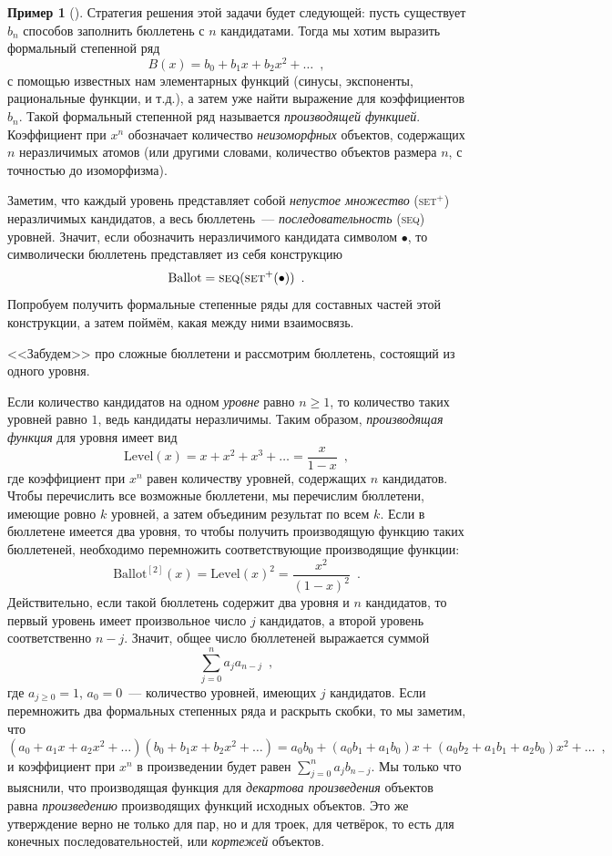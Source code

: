 \documentclass{article}
\theoremstyle{definition}
\newtheorem{example}{Пример}
\begin{document}
\begin{example}[{\cite[Example 10, p.36]{species}}]
Стратегия решения этой задачи будет следующей: пусть существует \( b_n \) 
способов заполнить бюллетень с \( n \) кандидатами. Тогда мы хотим выразить 
формальный степенной ряд
\[
	B(x) = b_0 + b_1 x + b_2 x^2 + \ldots \enspace ,
\]
с помощью известных нам элементарных функций (синусы, экспоненты, рациональные 
функции, и т.д.), а затем уже найти выражение для коэффициентов \( b_n \). 
Такой формальный степенной ряд называется \textit{производящей функцией}. 
Коэффициент при \( x^n \) обозначает количество \textit{неизоморфных} объектов, 
содержащих \( n \) неразличимых
атомов (или другими словами, количество объектов размера \( n \), с точностью 
до изоморфизма).

Заметим, что каждый уровень представляет собой \textit{непустое множество} 
(\textsc{set}\( ^{+} \)) неразличимых кандидатов, а весь бюллетень~--- 
\textit{последовательность} (\textsc{seq}) уровней. Значит, если обозначить 
неразличимого кандидата символом \( \bullet \), то символически бюллетень 
представляет из себя конструкцию
\[
	\mathrm{Ballot} = \text{\textsc{seq}(\textsc{set$^{+}$}($\bullet$))}
	\enspace .
\]
Попробуем получить формальные степенные ряды для составных частей этой 
конструкции, а затем поймём, какая между ними взаимосвязь.

<<Забудем>> про сложные бюллетени и рассмотрим бюллетень, состоящий из одного 
уровня.

Если количество кандидатов на одном \textit{уровне} равно \( n \geq 1 \), то 
количество таких уровней равно \( 1 \), ведь кандидаты неразличимы. Таким 
образом, \textit{производящая функция} для уровня имеет вид
\[
	\mathrm{Level}(x) = x + x^2 + x^3 + \ldots = \dfrac{x}{1-x} \enspace ,
\]
где коэффициент при \( x^n \)  равен количеству уровней, содержащих \( n \) 
кандидатов. Чтобы перечислить все возможные бюллетени, мы перечислим бюллетени, 
имеющие ровно \( k \) уровней, а затем объединим результат по всем \( k \). 
Если в бюллетене имеется два уровня, то чтобы получить производящую функцию 
таких бюллетеней, необходимо перемножить соответствующие производящие функции:
\[
	\mathrm{Ballot}^{[2]} (x) = \mathrm{Level}(x)^2 = \dfrac{x^2}{(1 - x)^2} 
	\enspace .
\]
Действительно, если такой бюллетень содержит два уровня и \( n \) кандидатов, 
то первый уровень имеет произвольное число \( j \) кандидатов, а второй уровень 
соответственно \( n-j \). Значит, общее число бюллетеней выражается суммой
\[
	\sum_{j=0}^{n} a_j a_{n-j} \enspace ,
\]
где \( a_{j \geq 0} = 1 \), \( a_0 = 0 \)~--- количество уровней, имеющих \( j 
\) кандидатов. Если перемножить два формальных степенных ряда и раскрыть 
скобки, то мы заметим, что
\[
	(a_0 + a_1 x + a_2 x^2 + \ldots) (b_0 + b_1 x + b_2 x^2 + \ldots) = a_0 b_0 
	+ (a_0 b_1 + a_1 b_0) x + (a_0 b_2 + a_1 b_1 + a_2 b_0) x^2 + \ldots
	\enspace ,
\]
и коэффициент при \( x^n \) в произведении будет равен \( \sum_{j=0}^{n} a_j 
b_{n-j} \). Мы только что выяснили, что производящая функция для 
\textit{декартова произведения} объектов равна \textit{произведению} 
производящих функций исходных объектов. Это же утверждение верно не только для 
пар, но и для троек, для четвёрок, то есть для конечных последовательностей, 
или \textit{кортежей}
объектов.


\end{example}
\end{document}
